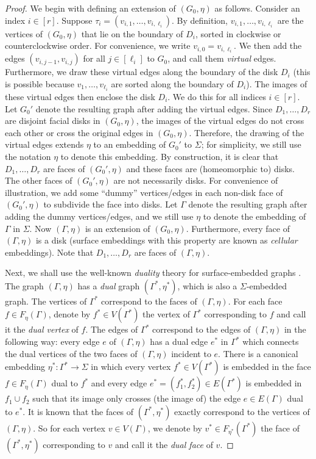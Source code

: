 \documentclass[a4paper,11pt]{article}
\numberwithin{lemma}{section}
\begin{document}
\begin{proof}
We begin with defining an extension of $(G_0,\eta)$ as follows.
Consider an index $i \in [r]$.
Suppose $\tau_i = (v_{i,1},\dots,v_{i,\ell_i})$.
By definition, $v_{i,1},\dots,v_{i,\ell_i}$ are the vertices of $(G_0,\eta)$ that lie on the boundary of $D_i$, sorted in clockwise or counterclockwise order.
For convenience, we write $v_{i,0} = v_{i,\ell_i}$.
We then add the edges $(v_{i,j-1},v_{i,j})$ for all $j \in [\ell_i]$ to $G_0$, and call them \emph{virtual} edges.
Furthermore, we draw these virtual edges along the boundary of the disk $D_i$ (this is possible because $v_1,\dots,v_{\ell_i}$ are sorted along the boundary of $D_i$).
The images of these virtual edges then enclose the disk $D_i$.
We do this for all indices $i \in [r]$.
Let $G_0'$ denote the resulting graph after adding the virtual edges.
Since $D_1,\dots,D_r$ are disjoint facial disks in $(G_0,\eta)$, the images of the virtual edges do not cross each other or cross the original edges in $(G_0,\eta)$.
Therefore, the drawing of the virtual edges extends $\eta$ to an embedding of $G_0'$ to $\varSigma$; for simplicity, we still use the notation $\eta$ to denote this embedding.
By construction, it is clear that $D_1,\dots,D_r$ are faces of $(G_0',\eta)$ and these faces are (homeomorphic to) disks.
The other faces of $(G_0',\eta)$ are not necessarily disks.
For convenience of illustration, we add some ``dummy'' vertices/edges in each non-disk face of $(G_0',\eta)$ to subdivide the face into disks.
Let $\varGamma$ denote the resulting graph after adding the dummy vertices/edges, and we still use $\eta$ to denote the embedding of $\varGamma$ in $\varSigma$.
Now $(\varGamma,\eta)$ is an extension of $(G_0,\eta)$.
Furthermore, every face of $(\varGamma,\eta)$ is a disk (surface embeddings with this property are known as \emph{cellular} embeddings).
Note that $D_1,\dots,D_r$ are faces of $(\varGamma,\eta)$.

Next, we shall use the well-known \emph{duality} theory for surface-embedded graphs \cite{MoharT01}.
The graph $(\varGamma,\eta)$ has a \emph{dual} graph $(\varGamma^*,\eta^*)$, which is also a $\varSigma$-embedded graph.
The vertices of $\varGamma^*$ correspond to the faces of $(\varGamma,\eta)$.
For each face $f \in F_\eta(\varGamma)$, denote by $f^* \in V(\varGamma^*)$ the vertex of $\varGamma^*$ corresponding to $f$ and call it the \emph{dual vertex} of $f$.
The edges of $\varGamma^*$ correspond to the edges of $(\varGamma,\eta)$ in the following way: every edge $e$ of $(\varGamma,\eta)$ has a dual edge $e^*$ in $\varGamma^*$ which connects the dual vertices of the two faces of $(\varGamma,\eta)$ incident to $e$.
There is a canonical embedding $\eta^*\colon\varGamma^* \rightarrow \varSigma$ in which every vertex $f^* \in V(\varGamma^*)$ is embedded in the face $f \in F_\eta(\varGamma)$ dual to $f^*$ and every edge $e^* = (f_1^*,f_2^*) \in E(\varGamma^*)$ is embedded in $f_1 \cup f_2$ such that its image only crosses (the image of) the edge $e \in E(\varGamma)$ dual to $e^*$.
It is known that the faces of $(\varGamma^*,\eta^*)$ exactly correspond to the vertices of $(\varGamma,\eta)$.
So for each vertex $v \in V(\varGamma)$, we denote by $v^* \in F_{\eta^*}(\varGamma^*)$ the face of $(\varGamma^*,\eta^*)$ corresponding to $v$ and call it the \emph{dual face} of $v$.


\end{proof}
\end{document}
